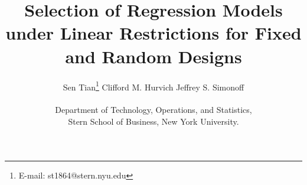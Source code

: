\documentclass{article}
\begin{document}
\def\spacingset#1{\renewcommand{\baselinestretch}%
{#1}\small\normalsize} \spacingset{1}


\title{\bf Selection of Regression Models under Linear Restrictions for Fixed and Random Designs}
\author{Sen Tian\footnote{E-mail: st1864@stern.nyu.edu} \quad Clifford M. Hurvich  \quad Jeffrey S. Simonoff \\\\
  Department of Technology, Operations, and Statistics, \\Stern School of Business, New York University.}
\date{}
\maketitle








\clearpage

%




\end{document}
